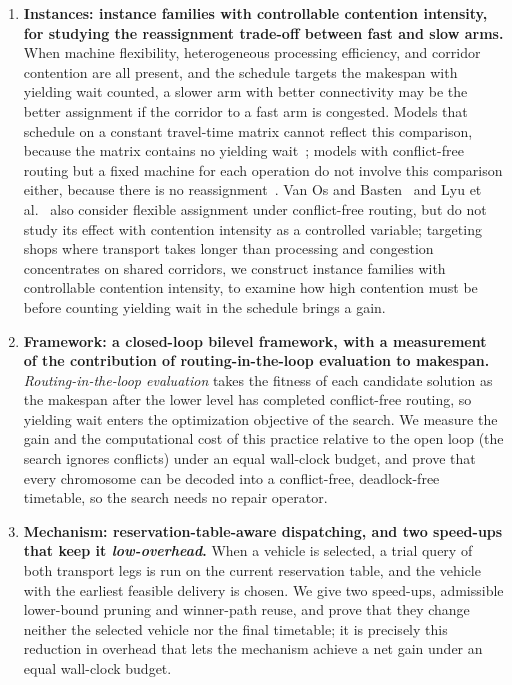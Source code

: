 \begin{enumerate}[leftmargin=*]

\item \textbf{Instances: instance families with controllable contention intensity, for studying the reassignment trade-off between fast and slow arms.} When machine flexibility, heterogeneous processing efficiency, and corridor contention are all present, and the schedule targets the makespan with yielding wait counted, a slower arm with better connectivity may be the better assignment if the corridor to a fast arm is congested.
Models that schedule on a constant travel-time matrix cannot reflect this comparison, because the matrix contains no yielding wait~\cite{sun2023integrated};
models with conflict-free routing but a fixed machine for each operation do not involve this comparison either, because there is no reassignment~\cite{li2026framework}.
Van Os and Basten~\cite{vanos2026exact} and Lyu et al.~\cite{lyu2019approach} also consider flexible assignment under conflict-free routing, but do not study its effect with contention intensity as a controlled variable; targeting shops where transport takes longer than processing and congestion concentrates on shared corridors, we construct instance families with controllable contention intensity, to examine how high contention must be before counting yielding wait in the schedule brings a gain.

\item \textbf{Framework: a closed-loop bilevel framework, with a measurement of the contribution of routing-in-the-loop evaluation to makespan.} \emph{Routing-in-the-loop evaluation} takes the fitness of each candidate solution as the makespan after the lower level has completed conflict-free routing, so yielding wait enters the optimization objective of the search.
We measure the gain and the computational cost of this practice relative to the open loop (the search ignores conflicts) under an equal wall-clock budget, and prove that every chromosome can be decoded into a conflict-free, deadlock-free timetable, so the search needs no repair operator.

\item \textbf{Mechanism: reservation-table-aware dispatching, and two speed-ups that keep it \emph{low-overhead}.} When a vehicle is selected, a trial query of both transport legs is run on the current reservation table, and the vehicle with the earliest feasible delivery is chosen.
We give two speed-ups, admissible lower-bound pruning and winner-path reuse, and prove that they change neither the selected vehicle nor the final timetable; it is precisely this reduction in overhead that lets the mechanism achieve a net gain under an equal wall-clock budget.


\end{enumerate}
